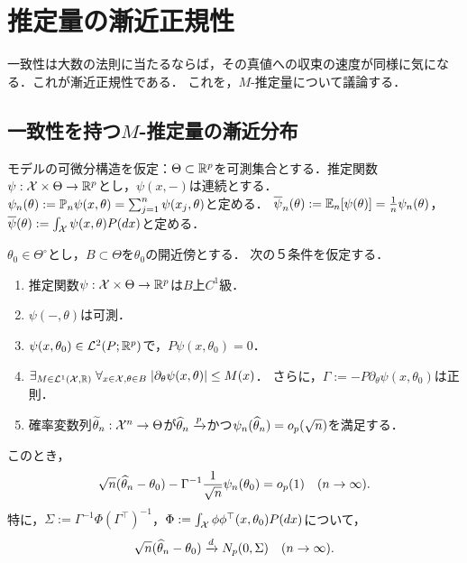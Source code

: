 \documentclass[uplatex,dvipdfmx]{jsreport}
\begin{document}
\begin{theorem}
    
\end{theorem}

\section{推定量の漸近正規性}

\begin{tcolorbox}[colframe=ForestGreen, colback=ForestGreen!10!white,breakable,colbacktitle=ForestGreen!40!white,coltitle=black,fonttitle=\bfseries\sffamily,
title=]
    一致性は大数の法則に当たるならば，その真値への収束の速度が同様に気になる．これが漸近正規性である．
    これを，$M$-推定量について議論する．
\end{tcolorbox}

\subsection{一致性を持つ$M$-推定量の漸近分布}

\begin{notation}
    モデルの可微分構造を仮定：$\Theta\subset\mathbb{R}^p$を可測集合とする．推定関数$\psi:\mathcal{X}\times\Theta\to\mathbb{R}^p$とし，$\psi(x,-)$は連続とする．
    $\psi_n(\theta):=\mathbb{P}_n\psi(x,\theta)=\sum_{j=1}^n\psi(x_j,\theta)$と定める．
    $\overline{\psi}_n(\theta):=\mathbb{E}_n[\psi(\theta)]=\frac{1}{n}\psi_n(\theta)$，
    $\overline{\psi}(\theta):=\int_{\mathcal{X}}\psi(x,\theta)P(dx)$と定める．
\end{notation}

\begin{theorem}[漸近正規性の十分条件]\label{thm-asymptotic-normality}
    $\theta_0\in\Theta^\circ$とし，$B\subset\Theta$を$\theta_0$の開近傍とする．
    次の５条件を仮定する．
    \begin{enumerate}[({E}1)]
        \item 推定関数$\psi:\mathcal{X}\times\Theta\to\mathbb{R}^p$は$B$上$C^1$級．
        \item $\psi(-,\theta)$は可測．
        \item $\psi(x,\theta_0)\in\mathcal{L}^2(P;\mathbb{R}^p)$で，$P\psi(x,\theta_0)=0$．
        \item $\exists_{M\in\mathcal{L}^1(\mathcal{X},\mathbb{R})}\;\forall_{x\in\mathcal{X},\theta\in B}\;\lvert\partial_\theta\psi(x,\theta)\rvert\leq M(x)$．
        さらに，$\Gamma:=-P\partial_\theta\psi(x,\theta_0)$は正則．
        \item 確率変数列$\widetilde{\theta}_n:\mathcal{X}^n\to\Theta$が$\widehat{\theta}_n\xrightarrow{p}$かつ$\psi_n(\widehat{\theta}_n)=o_p(\sqrt{n})$を満足する．
    \end{enumerate}
    このとき，
    \[\sqrt{n}(\widehat{\theta}_n-\theta_0)-\Gamma^{-1}\frac{1}{\sqrt{n}}\psi_n(\theta_0)=o_p(1)\quad(n\to\infty).\]
    特に，$\Sigma:=\Gamma^{-1}\Phi(\Gamma^{\top})^{-1}$，$\Phi:=\int_{\mathcal{X}}\phi\phi^{\top}(x,\theta_0)P(dx)$について，
    \[\sqrt{n}(\widehat{\theta}_n-\theta_0)\xrightarrow{d}N_p(0,\Sigma)\quad(n\to\infty).\]
\end{theorem}
\end{document}
